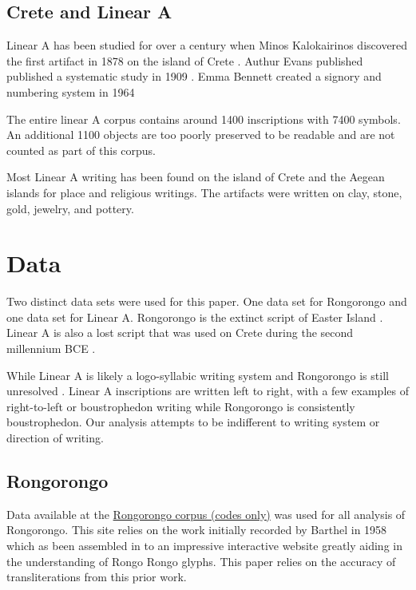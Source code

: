 \documentclass[preprint,12pt]{elsarticle}
\begin{document}
\subsection{ Crete and Linear A}
Linear A has been studied for over a century when Minos Kalokairinos discovered the first artifact in 1878 on the island of Crete \cite{owens1993_from_linear_a_to_linear_b}. Authur Evans published published a systematic study in 1909 \cite{evans1909_scripta_minoa}. Emma Bennett created a signory and numbering system in 1964 \cite{}

The entire linear A corpus contains around 1400 inscriptions with 7400 symbols. An additional 1100 objects are too poorly preserved to be readable and are not counted as part of this corpus.\cite{salgarella2025_writing_bronze_age_crete}

Most Linear A writing has been found on the island of Crete and the Aegean islands for place and religious writings. The artifacts were written on clay, stone, gold, jewelry, and pottery.  \cite{salgarella2025_writing_bronze_age_crete}

\section{Data}
\label{data}
Two distinct data sets were used for this paper. One data set for Rongorongo and one data set for Linear A. Rongorongo is the extinct script of Easter Island \cite{fischer1997rongorongo}. Linear A is also a lost script that was used on Crete during the second millennium BCE \cite{salgarella2021_sigla}.  

While Linear A is likely a logo-syllabic writing system \cite{salgarella2021_sigla} and Rongorongo is still unresolved \cite{tamburini2025_automatic_decipherment}.
Linear A inscriptions are written left to right, with a few examples of right-to-left or boustrophedon writing \cite{salgarella2022_linear_a} while Rongorongo is consistently boustrophedon\cite{}. Our analysis attempts to be indifferent to writing system or direction of writing. 

\subsection{Rongorongo}
Data available at the \href{http://kohaumotu.org/Rongorongo/Glyph_Library/glyph_variants.html}{Rongorongo corpus (codes only)}\cite{spaelti_2012_glyph} was used for all analysis of Rongorongo. This site relies on the work initially recorded by Barthel in 1958 \cite{barthel1958grundlagen} which as been assembled in to an impressive interactive website greatly aiding in the understanding of Rongo Rongo glyphs. This paper relies on the accuracy of transliterations from this prior work. 
\end{document}
